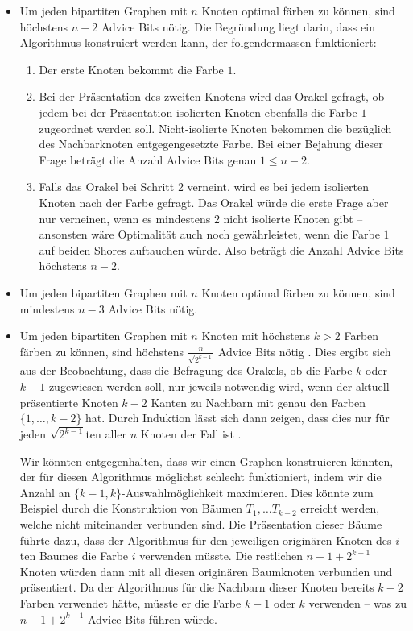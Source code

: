 \documentclass[11pt,abstracton]{scrreprt} %
\theoremstyle{definition}
\begin{document}
\begin{itemize}
\item Um jeden bipartiten Graphen mit $n$ Knoten optimal färben zu können, sind höchstens $n-2$ Advice Bits nötig. Die Begründung liegt darin, dass ein Algorithmus konstruiert werden kann, der folgendermassen funktioniert:

\begin{enumerate}
\item Der erste Knoten bekommt die Farbe $1$.
\item Bei der Präsentation des zweiten Knotens wird das Orakel gefragt, ob jedem bei der Präsentation isolierten Knoten ebenfalls die Farbe $1$ zugeordnet werden soll. Nicht-isolierte Knoten bekommen die bezüglich des Nachbarknoten entgegengesetzte Farbe. Bei einer Bejahung dieser Frage beträgt die Anzahl Advice Bits genau $1 \le n-2$.
\item Falls das Orakel bei Schritt 2 verneint, wird es bei jedem isolierten Knoten nach der Farbe gefragt. Das Orakel würde die erste Frage aber nur verneinen, wenn es mindestens $2$ nicht isolierte Knoten gibt -- ansonsten wäre Optimalität auch noch gewährleistet, wenn die Farbe $1$ auf beiden Shores auftauchen würde. Also beträgt die Anzahl Advice Bits höchstens $n-2$. \cite{bipartite}
\end{enumerate}

\item Um jeden bipartiten Graphen mit $n$ Knoten optimal färben zu können, sind mindestens $n-3$ Advice Bits nötig. \cite{bipartite}

\item Um jeden bipartiten Graphen mit $n$ Knoten mit höchstens $k > 2$ Farben färben zu können, sind höchstens
$\frac{n} { \sqrt{2^{k-1}}}$
Advice Bits nötig \cite{bipartite}. Dies ergibt sich aus der Beobachtung, dass die Befragung des Orakels, ob die Farbe $k$ oder $k-1$ zugewiesen werden soll, nur jeweils notwendig wird, wenn der aktuell präsentierte Knoten $k-2$ Kanten zu Nachbarn mit genau den Farben $\{1,\dots, k-2\}$ hat. Durch Induktion lässt sich dann zeigen, dass dies nur für jeden $ \sqrt{2^{k-1}}$ten aller $n$ Knoten der Fall ist \cite{bipartite, trotter}.

\bigskip
Wir könnten entgegenhalten, dass wir einen Graphen konstruieren könnten, der für diesen Algorithmus möglichst schlecht funktioniert, indem wir die Anzahl an $\{k-1, k\}$-Auswahlmöglichkeit maximieren. Dies könnte zum Beispiel durch die Konstruktion von Bäumen $T_1, \dots T_{k-2}$ erreicht werden, welche nicht miteinander verbunden sind. Die Präsentation dieser Bäume führte dazu, dass der Algorithmus für den jeweiligen originären Knoten des $i$ten Baumes die Farbe $i$ verwenden müsste. Die restlichen $n - 1 + 2^{k-1}$ Knoten würden dann mit all diesen originären Baumknoten verbunden und präsentiert. Da der Algorithmus für die Nachbarn dieser Knoten bereits $k-2$ Farben verwendet hätte, müsste er die Farbe $k-1$ oder $k$ verwenden -- was zu $n - 1 + 2^{k-1}$  Advice Bits führen würde.


\end{itemize}
\end{document}
